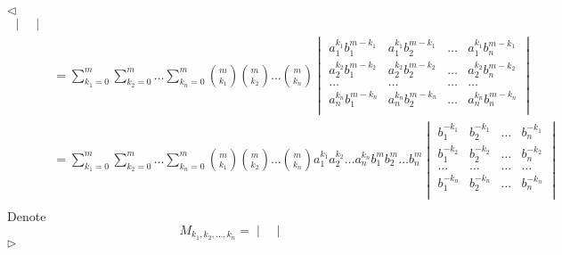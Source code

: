 \documentclass[12pt]{article}
\newenvironment{solution}{\par $\triangleleft$}{$\triangleright$}
\begin{document}
\begin{solution}
$$\begin{aligned}
\begin{vmatrix}
            \end{vmatrix} \\
             & =\sum\limits_{k_1=0}^m
            \sum\limits_{k_2=0}^m
            \ldots
            \sum\limits_{k_n=0}^m
            \binom{m}{k_1}
            \binom{m}{k_2}
            \ldots\binom{m}{k_n}
            \begin{vmatrix}
                a_1^{k_1} b_1^{m-k_1} &
                a_1^{k_1} b_2^{m-k_1} &
                \ldots                &
                a_1^{k_1} b_n^{m-k_1}   \\
                a_2^{k_2} b_1^{m-k_2} &
                a_2^{k_2} b_2^{m-k_2} &
                \ldots                &
                a_2^{k_2} b_n^{m-k_2}   \\
                \ldots                &
                \ldots                &
                \ldots                &
                \ldots                  \\
                a_n^{k_n} b_1^{m-k_n} &
                a_n^{k_n} b_2^{m-k_n} &
                \ldots                &
                a_n^{k_n} b_n^{m-k_n}   \\
            \end{vmatrix}     \\
             & =\sum\limits_{k_1=0}^m
            \sum\limits_{k_2=0}^m
            \ldots
            \sum\limits_{k_n=0}^m
            \binom{m}{k_1}
            \binom{m}{k_2}
            \ldots\binom{m}{k_n}
            a_1^{k_1}a_2^{k_2}
            \ldots
            a_n^{k_n} b_1^m b_2^m\ldots b_n^m
            \begin{vmatrix}
                b_1^{-k_1} &
                b_2^{-k_1} &
                \ldots     &
                b_n^{-k_1}   \\
                b_1^{-k_2} &
                b_2^{-k_2} &
                \ldots     &
                b_n^{-k_2}   \\
                \ldots     &
                \ldots     &
                \ldots     &
                \ldots       \\
                b_1^{-k_n} &
                b_2^{-k_n} &
                \ldots     &
                b_n^{-k_n}   \\
            \end{vmatrix}     \\
        \end{aligned}
    $$
    Denote
    $$
        M_{k_1,k_2,\ldots,k_n}=
        \begin{vmatrix}

\end{vmatrix}$$
\end{solution}
\end{document}
